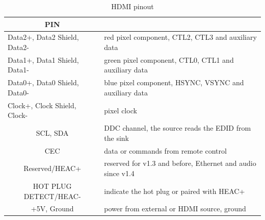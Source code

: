 \documentclass[]{spie}  %
\begin{document}
\begin{table}[]
\begin{tabular}{|c|l|}
\hline
\rowcolor[HTML]{C0C0C0} 
{\color[HTML]{000000} \textbf{PIN}} & \multicolumn{1}{c|}{\cellcolor[HTML]{C0C0C0}{\color[HTML]{000000} \textbf{DATA}}} \\ \hline
\multicolumn{1}{|l|}{Data2+, Data2 Shield, Data2-} & red pixel component, CTL2, CTL3 and auxiliary data \\ \hline
\multicolumn{1}{|l|}{Data1+, Data1 Shield, Data1-} & green pixel component, CTL0, CTL1 and auxiliary data \\ \hline
\multicolumn{1}{|l|}{Data0+, Data0 Shield, Data0-} & blue pixel component, HSYNC, VSYNC and auxiliary data \\ \hline
\multicolumn{1}{|l|}{Clock+, Clock Shield, Clock-} & pixel clock \\ \hline
SCL, SDA & DDC channel, the source reads the EDID from the sink \\ \hline
CEC & data or commands from remote control \\ \hline
Reserved/HEAC+ & reserved for v1.3 and before, Ethernet and audio since v1.4 \\ \hline
HOT PLUG DETECT/HEAC- & indicate the hot plug or paired with HEAC+ \\ \hline
+5V, Ground & power from external or HDMI source, ground \\ \hline
\end{tabular}\\
\caption{HDMI pinout}
\label{Tab:1}
\end{table}
\end{document}
